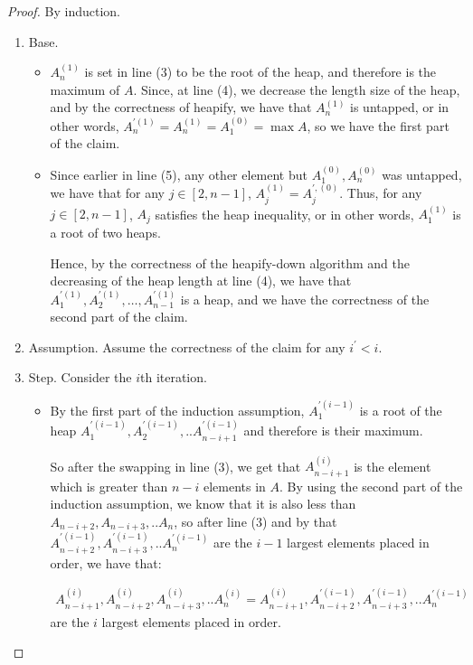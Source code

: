 \begin{proof}
By induction.
\begin{enumerate}
  \item Base. 
    \begin{itemize}
      \item $A^{(1)}_{n}$ is set in line (3) to be the root of the heap, and therefore is the maximum of $A$. Since, at line (4), we decrease the length size of the heap, and by the correctness of heapify, we have that $A^{(1)}_{n}$ is untapped, or in other words, $A^{\prime (1)}_{n} = A^{(1)}_{n} = A^{(0)}_{1} = \max A$, so we have the first part of the claim.

        \item Since earlier in line (5), any other element but $A^{(0)}_{1}, A^{(0)}_{n}$ was untapped, we have that for any $j \in [2,n-1]$, $A_{j}^{(1)} = A^{\prime, (0)}_{j}$. Thus, for any $j \in [2,n-1]$, $A_{j}$ satisfies the heap inequality, or in other words, $A^{(1)}_{1}$ is a root of two heaps.

        Hence, by the correctness of the heapify-down algorithm and the decreasing of the heap length at line (4), we have that $A^{\prime (1)}_{1}, A^{\prime (1)}_{2}, \ldots, A^{\prime (1)}_{n-1}$ is a heap, and we have the correctness of the second part of the claim.
    \end{itemize}

  \item Assumption. Assume the correctness of the claim for any $i^{\prime}<i$.
  \item Step. Consider the $i$th iteration. 

    \begin{itemize}
        \item By the first part of the induction assumption, $A^{\prime (i-1)}_{1}$ is a root of the heap $A^{\prime (i-1) }_{1},A^{\prime (i-1) }_{2},..A^{\prime (i-1) }_{n-i+1}$  and therefore is their maximum.

        So after the swapping in line (3), we get that $A^{(i)}_{n-i+1}$ is the element which is greater than $n-i$ elements in $A$. By using the second part of the induction assumption, we know that it is also less than $A_{n-i+2},A_{n-i+3},..A_{n}$, so after line (3) and by that 
        $A^{\prime (i-1) }_{n-i+2},A^{\prime (i-1) }_{n-i+3},..A^{\prime (i-1) }_{n}$ are the $i-1$ largest elements placed in order,
        we have that:

        \begin{equation*}
          \begin{split}
            A^{(i) }_{n-i+1},A^{(i) }_{n-i+2},A^{(i) }_{n-i+3},..A^{(i) }_{n} = A^{(i) }_{n-i+1},A^{\prime (i-1) }_{n-i+2},A^{\prime (i-1) }_{n-i+3},..A^{ \prime (i-1) }_{n}
          \end{split}
        \end{equation*}
        are the $i$ largest elements placed in order. 


\end{itemize}
\end{enumerate}
\end{proof}
